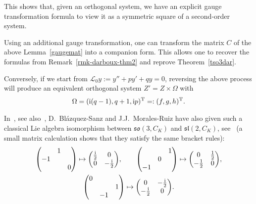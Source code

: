 \documentclass[10pt,a4paper]{amsart}
\numberwithin{equation}{section}
\begin{document}
This shows that, given an orthogonal system, we have an explicit gauge transformation formula to view it as a symmetric square of a second-order system.

\begin{Remark}
Using an additional gauge transformation, one can transform the matrix $C$ of the above Lemma~\ref{gaugemat}
into a companion form. This allows one to recover the formulas from Remark~\ref{rmk-darboux-thm2} and reprove Theorem~\ref{tso3dar}.

Conversely, if we start from $ \mathcal{L}_0 y:= y''+ p y'+ q y=0$, reversing the above process will produce an equivalent orthogonal system $Z'=Z \times \Omega$ with
\begin{gather*}
\Omega=( {\rm i} (q-1) , q+1,{\rm i} p)^{\rm T} =: (f,g,h)^{\rm T}.
\end{gather*}
\end{Remark}

In~\cite{Blaz-M}, see also~\cite{Blaz}, D.~Bl\'azquez-Sanz and J.J.~Morales-Ruiz have also given such a classical Lie algebra isomorphism between $\mathfrak{so}(3, C_K)$ and $\mathfrak{sl} (2, C_K)$, see~\cite[Proposition~6.7]{Blaz-M} (a small matrix calculation shows that they satisfy the same bracket rules):
\begin{gather*}
 \begin{pmatrix} & 1 & \\ -1 & & \\ & & 0 \end{pmatrix} \mapsto \begin{pmatrix} \frac{\rm i}{2} & 0 \\ 0 & -\frac{\rm i}{2} \end{pmatrix}\!, \qquad
 \begin{pmatrix} & & 1 \\ & 0 & \\ -1 & & \end{pmatrix} \mapsto \begin{pmatrix} 0 & \frac{1}{2} \\ -\frac{1}{2} & 0 \end{pmatrix}\!, \\
 \begin{pmatrix} 0 & & \\ & & 1 \\ & -1 & \end{pmatrix} \mapsto \begin{pmatrix} 0 & -\frac{\rm i}{2} \\ -\frac{\rm i}{2} & 0 \end{pmatrix}\!.
\end{gather*}
\end{document}
